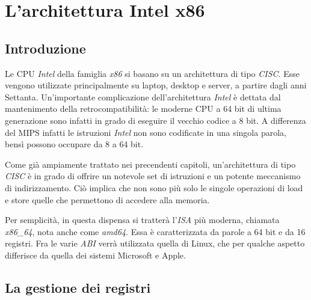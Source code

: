 \documentclass[class=book, crop=false]{standalone}
\begin{document}
\chapter{L'architettura Intel x86}

\section{Introduzione}
Le CPU \emph{Intel} della famiglia \emph{x86} si basano su un architettura di tipo \emph{CISC}. Esse vengono utilizzate principalmente su laptop, desktop e server, a partire dagli anni Settanta. Un'importante complicazione dell'architettura \emph{Intel} è dettata dal mantenimento della retrocompatibilità: le moderne CPU a 64 bit di ultima generazione sono infatti in grado di eseguire il vecchio codice a 8 bit. A differenza del MIPS infatti le istruzioni \emph{Intel} non sono codificate in una singola parola, bensì possono occupare da 8 a 64 bit.

Come già ampiamente trattato nei precendenti capitoli, un'architettura di tipo \emph{CISC} è in grado di offrire un notevole set di istruzioni e un potente meccanismo di indirizzamento. Ciò implica che non sono più solo le singole operazioni di load e store quelle che permettono di accedere alla memoria.

Per semplicità, in questa dispensa si tratterà l'\emph{ISA} più moderna, chiamata \emph{x86\_64}, nota anche come \emph{amd64}. Essa è caratterizzata da parole a 64 bit e da 16 registri. Fra le varie \emph{ABI} verrà utilizzata quella di Linux, che per qualche aspetto differisce da quella dei sistemi Microsoft e Apple.

\section{La gestione dei registri}
\end{document}
